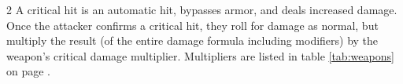 \begin{multicols*}{2}
    A critical hit is an automatic hit, bypasses armor, and deals increased
    damage. Once the attacker confirms a critical hit, they roll for damage
    as normal, but multiply the result (of the entire damage formula including
    modifiers) by the weapon's critical damage
    multiplier. Multipliers are
    listed in table \ref{tab:weapons} on page \pageref{tab:weapons}.
\end{multicols*}
